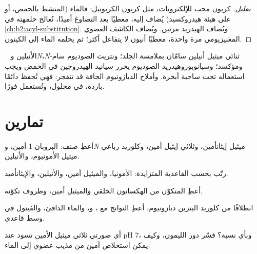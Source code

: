 \begin{proof}[تعليل]
كربون  محب للإلكترونات، مثل كربون الكربونيل: فالماء (المنشط بالحمض، أو على هيئة
هيدروكسيد) يُضاف إليه، معطيًا بعد التصاوغ أميدًا، تُعالج حلمهته في
\cref{ch:b2:acyl-substitution}. ويُضاف الهيدريد مرتين. ويُضاف الكاشف العضوي المغنيزيومي مرة واحدة،
معطيًا أنيون  لا يتفاعل أكثر؛ ثم يحلمه الماء إلى الكيتون.
\end{proof}

\begin{safety}{\,\,\,}
الأنيلين و\textit{N}،\textit{N}-ثنائي ميثيل أنيلين سامّان بملامسة الجلد؛ ونتريت الصوديوم
سام ومؤكسد؛ وسيانوبوروهيدريد الصوديوم يحرر سيانيد الهيدروجين في الحمض ويجب استعماله
تحت ساحبة أبخرة. وأملاح الديازونيوم الجافة قد تنفجر: فهي تُحفظ دائمًا باردة، في محلول، وتُستعمل
فورًا.
\end{safety}

\section{تمارين}

\begin{exercise}[$\star$]\label{exo:b2:amines:1}
أعطِ صنف: البروبان-1-أمين، و\textit{N}-ميثيل إيثانأمين، وثلاثي إيثيل أمين،
وكلوريد رباعي ميثيل الأمونيوم، والأنيلين.
\end{exercise}

\begin{exercise}[$\star$]\label{exo:b2:amines:2}
رتّب بحسب القاعدية المتزايدة: الأمونيا، والميثيل أمين، والأنيلين، والإيثانأميد.
\end{exercise}

\begin{exercise}[$\star$]\label{exo:b2:amines:3}
أعطِ  المتكوّن من الهكسانون الحلقي والميثيل أمين، وظروف تكوّنه.
\end{exercise}

\begin{exercise}[$\star$]\label{exo:b2:amines:4}
انطلاقًا من كلوريد البنزين ديازونيوم، أعطِ النواتج مع ، و، والماء الدافئ،
والفينول في وسط قاعدي.
\end{exercise}

\begin{exercise}[$\star\star$]\label{exo:b2:amines:5}
أي صورتي ثلاثي ميثيل الأمين تسود عند pH 7، وبأي نسبة؟ فسّر دور الليمون، وكيف يمكن
استخلاص أمين من مذيب عضوي إلى الماء.
\end{exercise}

